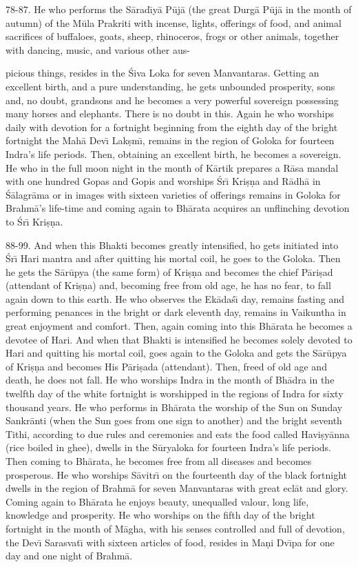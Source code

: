 78-87. He who performs the S\=arad\={\i}y\=a P\=uj\=a (the great Durg\=a P\=uj\=a in the month of autumn) of the M\=ula Prakriti with incense, lights, offerings of food, and animal sacrifices of buffaloes, goats, sheep, rhinoceros, frogs or other animals, together with dancing, music, and various other aus-

picious things, resides in the \'Siva Loka for seven Manvantaras. Getting an excellent birth, and a pure understanding, he gets unbounded prosperity, sons and, no doubt, grandsons and he becomes a very powerful sovereign possessing many horses and elephants. There is no doubt in this. Again he who worships daily with devotion for a fortnight beginning from the eighth day of the bright fortnight the Mah\=a Dev\={\i} Lak\d{s}m\={\i}, remains in the region of Goloka for fourteen Indra's life periods. Then, obtaining an excellent birth, he becomes a sovereign. He who in the full moon night in the month of K\=artik prepares a R\=asa mandal with one hundred Gopas and Gopis and worships \'Sr\={\i} Kri\d{s}\d{n}a and R\=adh\=a in \'S\=alagr\=ama or in images with sixteen varieties of offerings remains in Goloka for Brahm\=a's life-time and coming again to Bh\=arata acquires an unflinching devotion to \'Sr\={\i} Kri\d{s}\d{n}a.

88-99. And when this Bhakti becomes greatly intensified, ho gets initiated into \'Sr\={\i} Hari mantra and after quitting his mortal coil, he goes to the Goloka. Then he gets the S\=ar\=upya (the same form) of Kri\d{s}\d{n}a and becomes the chief P\=ari\d{s}ad (attendant of Kri\d{s}\d{n}a) and, becoming free from old age, he has no fear, to fall again down to this earth. He who observes the Ek\=ada\'s\={\i} day, remains fasting and performing penances in the bright or dark eleventh day, remains in Vaikuntha in great enjoyment and comfort. Then, again coming into this Bh\=arata he becomes a devotee of Hari. And when that Bhakti is intensified he becomes solely devoted to Hari and quitting his mortal coil, goes again to the Goloka and gets the S\=ar\=upya of Kri\d{s}\d{n}a and becomes His P\=ari\d{s}ada (attendant). Then, freed of old age and death, he does not fall. He who worships Indra in the month of Bh\=adra in the twelfth day of the white fortnight is worshipped in the regions of Indra for sixty thousand years. He who performs in Bh\=arata the worship of the Sun on Sunday Sankr\=anti (when the Sun goes from one sign to another) and the bright seventh Tithi, according to due rules and ceremonies and eats the food called Havi\d{s}y\=anna (rice boiled in ghee), dwells in the S\=uryaloka for fourteen Indra's life periods. Then coming to Bh\=arata, he becomes free from all diseases and becomes prosperous. He who worships S\=avitr\={\i} on the fourteenth day of the black fortnight dwells in the region of Brahm\=a for seven Manvantaras with great ecl\=at and glory. Coming again to Bh\=arata he enjoys beauty, unequalled valour, long life, knowledge and prosperity. He who worships on the fifth day of the bright fortnight in the month of M\=agha, with his senses controlled and full of devotion, the Dev\={\i} Sarasvat\={\i} with sixteen articles of food, resides in Ma\d{n}i Dv\={\i}pa for one day and one night of Brahm\=a.

